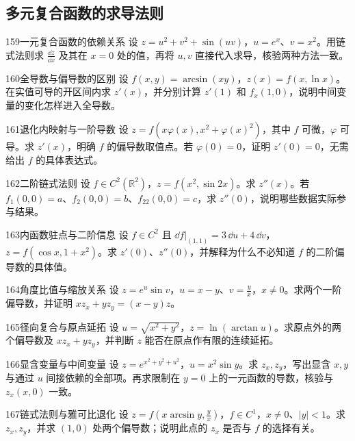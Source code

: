 \subsection{多元复合函数的求导法则}
\begin{exercise}{159}{一元复合函数的依赖关系}
设 $z=u^2+v^2+\sin(uv)$，$u=e^x$、$v=x^2$。用链式法则求 $\frac{\dd z}{\dd x}$ 及其在 $x=0$ 处的值，再将 $u,v$ 直接代入求导，核验两种方法一致。
\end{exercise}
\begin{exercise}{160}{全导数与偏导数的区别}
设 $f(x,y)=\arcsin(xy)$，$z(x)=f(x,\ln x)$。在实值可导的开区间内求 $z'(x)$，并分别计算 $z'(1)$ 和 $f_x(1,0)$，说明中间变量的变化怎样进入全导数。
\end{exercise}
\begin{exercise}{161}{退化内映射与一阶导数}
设 $z=f(x\varphi(x),x^2+\varphi(x)^2)$，其中 $f$ 可微，$\varphi$ 可导。求 $z'(x)$，明确 $f$ 的偏导数取值点。若 $\varphi(0)=0$，证明 $z'(0)=0$，无需给出 $f$ 的具体表达式。
\end{exercise}
\begin{exercise}{162}{二阶链式法则}
设 $f\in C^2(\mathbb R^2)$，$z=f(x^2,\sin2x)$。求 $z''(x)$。若 $f_1(0,0)=a$、$f_2(0,0)=b$、$f_{22}(0,0)=c$，求 $z''(0)$，说明哪些数据实际参与结果。
\end{exercise}
\begin{exercise}{163}{内函数驻点与二阶信息}
设 $f\in C^2$ 且 $\dd f|_{(1,1)}=3\,\dd u+4\,\dd v$，$z=f(\cos x,1+x^2)$。求 $z'(0)$、$z''(0)$，并解释为什么不必知道 $f$ 的二阶偏导数的具体值。
\end{exercise}
\begin{exercise}{164}{角度比值与缩放关系}
设 $z=e^u\sin v$，$u=x-y$、$v=\frac yx$，$x\ne0$。求两个一阶偏导数，并证明 $xz_x+yz_y=(x-y)z$。
\end{exercise}
\begin{exercise}{165}{径向复合与原点延拓}
设 $u=\sqrt{x^2+y^2}$，$z=\ln(\arctan u)$。求原点外的两个偏导数及 $xz_x+yz_y$，并判断 $z$ 能否在原点作有限的连续延拓。
\end{exercise}
\begin{exercise}{166}{显含变量与中间变量}
设 $z=e^{x^2+y^2+u^2}$，$u=x^2\sin y$。求 $z_x,z_y$，写出显含 $x,y$ 与通过 $u$ 间接依赖的全部项。再求限制在 $y=0$ 上的一元函数的导数，核验与 $z_x(x,0)$ 一致。
\end{exercise}
\begin{exercise}{167}{链式法则与雅可比退化}
设 $z=f(x\arcsin y,\frac yx)$，$f\in C^1$，$x\ne0$、$|y|<1$。求 $z_x,z_y$，并求 $(1,0)$ 处两个偏导数；说明此点的 $z_x$ 是否与 $f$ 的选择有关。
\end{exercise}
